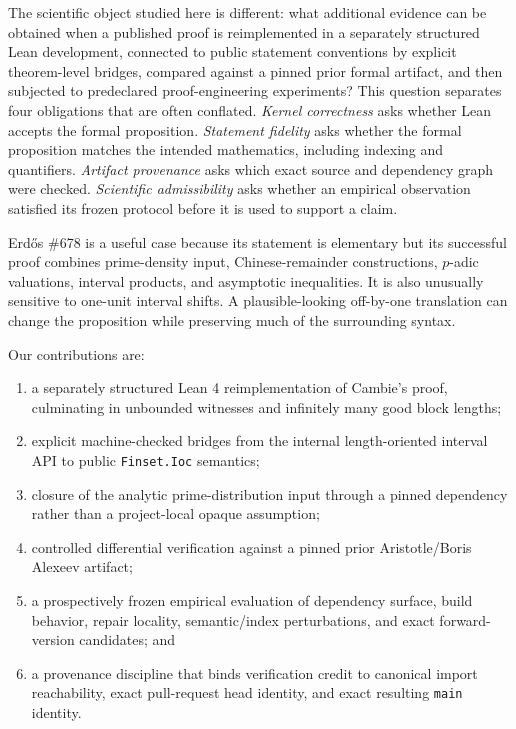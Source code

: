 \documentclass[sigplan,10pt,anonymous,review]{acmart}
\newcommand{\code}[1]{\texttt{#1}}
\newcommand{\tpath}[1]{\path{#1}}
\begin{document}
The scientific object studied here is different: what additional evidence can be obtained when a published proof is reimplemented in a separately structured Lean development, connected to public statement conventions by explicit theorem-level bridges, compared against a pinned prior formal artifact, and then subjected to predeclared proof-engineering experiments? This question separates four obligations that are often conflated. \emph{Kernel correctness} asks whether Lean accepts the formal proposition. \emph{Statement fidelity} asks whether the formal proposition matches the intended mathematics, including indexing and quantifiers. \emph{Artifact provenance} asks which exact source and dependency graph were checked. \emph{Scientific admissibility} asks whether an empirical observation satisfied its frozen protocol before it is used to support a claim.

Erd\H{o}s \#678 is a useful case because its statement is elementary but its successful proof combines prime-density input, Chinese-remainder constructions, $p$-adic valuations, interval products, and asymptotic inequalities. It is also unusually sensitive to one-unit interval shifts. A plausible-looking off-by-one translation can change the proposition while preserving much of the surrounding syntax.

Our contributions are:
\begin{enumerate}
\item a separately structured Lean 4 reimplementation of Cambie's proof, culminating in unbounded witnesses and infinitely many good block lengths;
\item explicit machine-checked bridges from the internal length-oriented interval API to public \code{Finset.Ioc} semantics;
\item closure of the analytic prime-distribution input through a pinned \tpath{PrimeNumberTheoremAnd} dependency rather than a project-local opaque assumption;
\item controlled differential verification against a pinned prior Aristotle/Boris Alexeev artifact;
\item a prospectively frozen empirical evaluation of dependency surface, build behavior, repair locality, semantic/index perturbations, and exact forward-version candidates; and
\item a provenance discipline that binds verification credit to canonical import reachability, exact pull-request head identity, and exact resulting \code{main} identity.
\end{enumerate}
\end{document}
